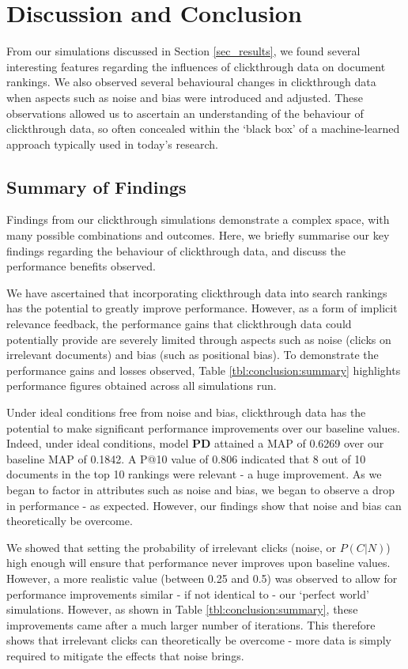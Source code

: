 \section{Discussion and Conclusion}\label{sec_conclusion}
From our simulations discussed in Section \ref{sec_results}, we found several interesting features regarding the influences of clickthrough data on document rankings. We also observed several behavioural changes in clickthrough data when aspects such as noise and bias were introduced and adjusted. These observations allowed us to ascertain an understanding of the behaviour of clickthrough data, so often concealed within the `black box' of a machine-learned approach typically used in today's research.

\subsection{Summary of Findings}\label{sec:conclusion:summary}
Findings from our clickthrough simulations demonstrate a complex space, with many possible combinations and outcomes. Here, we briefly summarise our key findings regarding the behaviour of clickthrough data, and discuss the performance benefits observed.

We have ascertained that incorporating clickthrough data into search rankings has the potential to greatly improve performance. 
However, as a form of implicit relevance feedback, the performance gains that clickthrough data could potentially provide are severely limited through aspects such as noise (clicks on irrelevant documents) and bias (such as positional bias). To demonstrate the performance gains and losses observed, Table \ref{tbl:conclusion:summary} highlights performance figures obtained across all simulations run.

Under ideal conditions free from noise and bias, clickthrough data has the potential to make significant performance improvements over our baseline values. Indeed, under ideal conditions, model \textbf{PD} attained a MAP of 0.6269 over our baseline MAP of 0.1842. A P@10 value of 0.806 indicated that 8 out of 10 documents in the top 10 rankings were relevant - a huge improvement. As we began to factor in attributes such as noise and bias, we began to observe a drop in performance - as expected. However, our findings show that noise and bias can theoretically be overcome.

We showed that setting the probability of irrelevant clicks (noise, or $P(C|N)$) high enough will ensure that performance never improves upon baseline values. However, a more realistic value (between 0.25 and 0.5) was observed to allow for performance improvements similar - if not identical to - our `perfect world' simulations. However, as shown in Table \ref{tbl:conclusion:summary}, these improvements came after a much larger number of iterations. This therefore shows that irrelevant clicks can theoretically be overcome - more data is simply required to mitigate the effects that noise brings.


